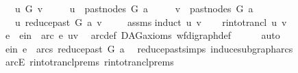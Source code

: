 \begin{isabellebody}
\ \ \ {\isachardoublequoteopen}u\ {\isasymrightarrow}\isactrlsup {\isacharplus}{\kern0pt}\isactrlbsub G\isactrlesub \ v{\isachardoublequoteclose}\isanewline
\ \ \ \ \ {\isachardoublequoteopen}u\ {\isasymin}\ past{\isacharunderscore}{\kern0pt}nodes\ G\ a{\isachardoublequoteclose}\isanewline
\ \ \ \ \ {\isachardoublequoteopen}v\ {\isasymin}\ past{\isacharunderscore}{\kern0pt}nodes\ G\ a{\isachardoublequoteclose}\isanewline
\ \ \ {\isachardoublequoteopen}u\ {\isasymrightarrow}\isactrlsup {\isacharplus}{\kern0pt}\isactrlbsub reduce{\isacharunderscore}{\kern0pt}past\ G\ a\isactrlesub \ v{\isachardoublequoteclose}\ \isanewline
%
\isadelimproof
\ \ %
\endisadelimproof
%
\isatagproof
{}\isamarkupfalse%
\ assms\isanewline
{}\isamarkupfalse%
{\isacharparenleft}{\kern0pt}induct\ u\ v{\isacharparenright}{\kern0pt}\isanewline
\ \ \isamarkupfalse%
\ {\isacharparenleft}{\kern0pt}r{\isacharunderscore}{\kern0pt}into{\isacharunderscore}{\kern0pt}trancl\ u\ v\ {\isacharparenright}{\kern0pt}\isanewline
\ \ \isamarkupfalse%
\ \isamarkupfalse%
\ e\ \ e{\isacharunderscore}{\kern0pt}in{\isacharcolon}{\kern0pt}\ {\isachardoublequoteopen}\ arc\ e\ {\isacharparenleft}{\kern0pt}u{\isacharcomma}{\kern0pt}v{\isacharparenright}{\kern0pt}{\isachardoublequoteclose}\ \isamarkupfalse%
\ arc{\isacharunderscore}{\kern0pt}def\ DAG{\isacharunderscore}{\kern0pt}axioms\ wf{\isacharunderscore}{\kern0pt}digraph{\isacharunderscore}{\kern0pt}def\isanewline
\ \ \ \ \isamarkupfalse%
\ auto\ \isanewline
\ \ \isamarkupfalse%
\ \isamarkupfalse%
\ e{\isacharunderscore}{\kern0pt}in{}{\isacharcolon}{\kern0pt}\ {\isachardoublequoteopen}e\ {\isasymin}\ arcs\ {\isacharparenleft}{\kern0pt}reduce{\isacharunderscore}{\kern0pt}past\ G\ a{\isacharparenright}{\kern0pt}{\isachardoublequoteclose}\ \isamarkupfalse%
\ reduce{\isacharunderscore}{\kern0pt}past{\isachardot}{\kern0pt}simps\ induce{\isacharunderscore}{\kern0pt}subgraph{\isacharunderscore}{\kern0pt}arcs\isanewline
\ \ \ \ \isamarkupfalse%
\ arcE\ r{\isacharunderscore}{\kern0pt}into{\isacharunderscore}{\kern0pt}trancl{\isachardot}{\kern0pt}prems{\isacharparenleft}{\kern0pt}{}{\isacharparenright}{\kern0pt}\ r{\isacharunderscore}{\kern0pt}into{\isacharunderscore}{\kern0pt}trancl{\isachardot}{\kern0pt}prems{\isacharparenleft}{\kern0pt}{}{\isacharparenright}{\kern0pt}\ \isamarkupfalse%

\end{isabellebody}
